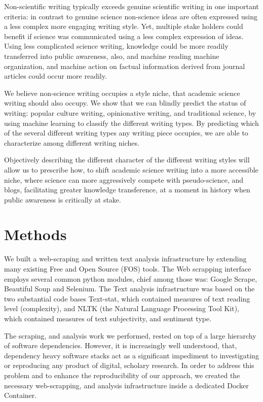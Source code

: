 \documentclass{clv3}
\begin{document}
Non-scientific writing typically exceeds genuine scientific writing in one important criteria: in contrast to genuine science non-science ideas are often expressed using a less complex more engaging writing style.  Yet, multiple stake holders could benefit if science was communicated using a less complex expression of ideas. Using less complicated science writing, knowledge could be more readily transferred into public awareness, also, and machine reading machine organization, and machine action on factual information derived from journal articles could occur more readily.

We believe non-science writing occupies a style niche, that academic science writing should also occupy. We show that we can blindly predict the status of writing: popular culture writing, opinionative writing, and traditional science, by using machine learning to classify the different writing types. By predicting which of the several different writing types any writing piece occupies, we are able to characterize among different writing niches.

Objectively describing the different character of the different writing styles will allow us to prescribe how, to shift academic science writing into a more accessible niche, where science can more aggressively compete with pseudo-science, and blogs, facilitating greater knowledge transference, at a moment in history when public awareness is critically at stake.


\section{Methods}

We built a web-scraping and written text analysis infrastructure by extending many existing Free and Open Source (FOS) tools. The Web scrapping interface employs several common python modules, chief among those was: Google Scrape, Beautiful Soup and Selenium. The Text analysis infrastructure was based on the two substantial code bases Text-stat, which contained measures of text reading level (complexity), and NLTK (the Natural Language Processing Tool Kit), which contained measures of text subjectivity, and sentiment type.

The scraping, and analysis work we performed, rested on top of a large hierarchy of software dependencies. However, it is increasingly well understood, that, dependency heavy software stacks act as a significant impediment to investigating or reproducing any product of digital, scholary research. In order to address this problem and to enhance the reproducibility of our approach, we created the necessary web-scrapping, and analysis infrastructure inside a dedicated Docker Container.
\end{document}
